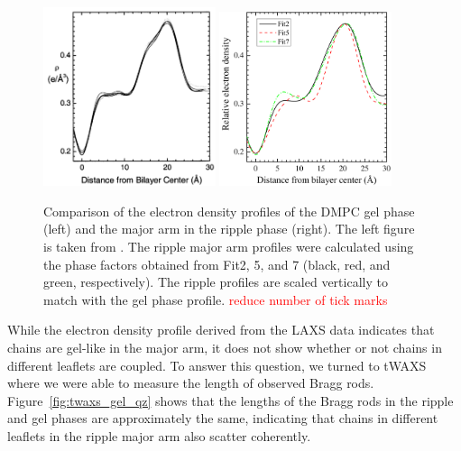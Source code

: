 \begin{figure}[htbp]
  \centering
  \includegraphics[width=0.45\textwidth]{figures/ripple/discussion/Tristram-Nagle_gel_DMPC}
  \includegraphics[width=0.45\textwidth]{figures/ripple/discussion/major_edp}
  \caption{Comparison of the electron density profiles of the DMPC gel phase (left)
  and the major arm in the ripple phase (right). The left figure is taken from 
  \cite{Tristram-Nagle02}. The ripple major arm profiles were calculated 
  using the phase factors obtained from Fit2, 5, and 7 (black, red, and green, respectively). 
  The ripple profiles are scaled vertically to match 
  with the gel phase profile. \textcolor{red}{reduce number of tick marks}}
  \label{fig:gel_comparison}
\end{figure}

While the electron density profile derived from the LAXS data indicates that 
chains are gel-like in the major arm, it does not show whether or not chains 
in different leaflets are coupled. To answer this question, we turned to
tWAXS where we were able to measure the length of 
observed Bragg rods. Figure~\ref{fig:twaxs_gel_qz} shows that the lengths of the Bragg
rods in the ripple and gel phases are approximately the same, indicating that
chains in different leaflets in the ripple major arm also scatter coherently.

